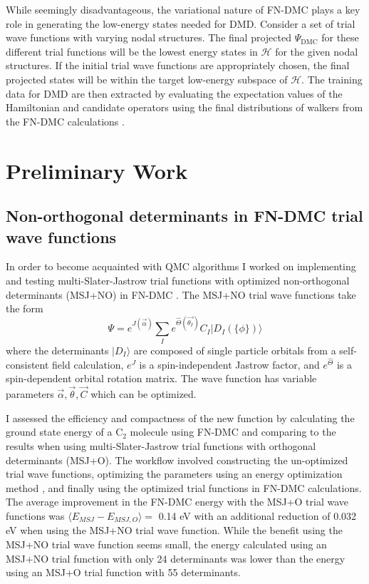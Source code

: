\documentclass[12pt]{article}
\begin{document}
While seemingly disadvantageous, the variational nature of FN-DMC plays
a key role in generating the low-energy states needed for DMD.
Consider a set of trial wave functions with varying nodal structures.
The final projected $\Psi_\text{DMC}$ for these different trial functions will be the lowest energy states in $\mathcal{H}$ for the given nodal structures.
If the initial trial wave functions are appropriately chosen, the final projected states will be within the target low-energy subspace of $\mathcal{H}$.
The training data for DMD are then extracted by evaluating the expectation values of the Hamiltonian and candidate operators using the final distributions of walkers from the FN-DMC calculations \cite{Wagner2015}.

\section{Preliminary Work}
\subsection{Non-orthogonal determinants in FN-DMC trial wave functions}
In order to become acquainted with QMC algorithms I worked on implementing and testing multi-Slater-Jastrow trial functions with optimized non-orthogonal determinants (MSJ+NO) in FN-DMC \cite{doi:10.1063/1.5052906}.
The MSJ+NO trial wave functions take the form
\begin{equation}
\Psi=e^{J(\vec{\alpha})} \sum_I e^{\hat{\Theta}(\vec{\theta_I})} C_I |D_I (\{ \phi\})\rangle
\end{equation}
where the determinants $|D_I\rangle$ are composed of single particle orbitals from a self-consistent field calculation, $e^J$ is a spin-independent Jastrow factor, and $e^{\hat{\Theta}}$ is a spin-dependent orbital rotation matrix.
The wave function has variable parameters $\vec{\alpha}, \vec{\theta}, \vec{C}$ which can be optimized.

I assessed the efficiency and compactness of the new function by calculating the ground state energy of a C$_2$ molecule using FN-DMC and comparing to the results when using multi-Slater-Jastrow trial functions with orthogonal determinants (MSJ+O). 
The workflow involved constructing the un-optimized trial wave functions, optimizing the parameters using an energy optimization method \cite{Toulouse2007}, and finally using the optimized trial functions in FN-DMC calculations. 
The average improvement in the FN-DMC energy with the MSJ+O trial wave functions was $\langle E_{MSJ} - E_{MSJ,O}\rangle =$ 0.14 eV with an additional reduction of 0.032 eV when using the MSJ+NO trial wave function.
While the benefit using the MSJ+NO trial wave function seems small, the energy calculated using an MSJ+NO trial function with only 24 determinants was lower than the energy using an MSJ+O trial 
function with 55 determinants.
\end{document}
